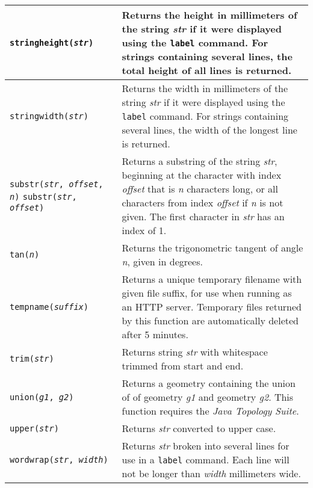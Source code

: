 \begin{longtable}{|p{5cm}|p{7cm}|}
\hline

\texttt{stringheight(\textit{str})} &
Returns the height in millimeters of the string \textit{str}
if it were displayed using the \texttt{label} command.
For strings containing several lines, the total height of all
lines is returned.  \\

\hline

\texttt{stringwidth(\textit{str})} &
Returns the width in millimeters of the string \textit{str}
if it were displayed using the \texttt{label} command.
For strings containing several lines, the width of the longest
line is returned.  \\

\hline

\texttt{substr(\textit{str}, \textit{offset}, \textit{n})}
\texttt{substr(\textit{str}, \textit{offset})} &
Returns a substring of the string \textit{str}, beginning at the
character with index \textit{offset} that is \textit{n} characters long,
or all characters from index \textit{offset} if
\textit{n} is not given.
The first character in \textit{str} has an index of 1. \\

\hline

\texttt{tan(\textit{n})} &
Returns the trigonometric tangent of angle \textit{n}, given in degrees. \\

\hline

\texttt{tempname(\textit{suffix})} &
Returns a unique temporary filename with given file suffix,
for use when running as an HTTP server.
Temporary files returned by this function
are automatically deleted after 5 minutes. \\

\hline
\texttt{trim(\textit{str})} &
Returns string \textit{str} with whitespace trimmed from start and end. \\

\hline

\texttt{union(\textit{g1}, \textit{g2})} &
Returns a geometry containing the union of 
of geometry \textit{g1} and geometry \textit{g2}.
This function requires the \textit{Java Topology Suite}. \\

\hline

\texttt{upper(\textit{str})} &
Returns \textit{str} converted to upper case. \\

\hline

\texttt{wordwrap(\textit{str}, \textit{width})} &
Returns \textit{str} broken into several lines for
use in a \texttt{label} command.
Each line will not be
longer than \textit{width} millimeters wide. \\

\hline
\end{longtable}

